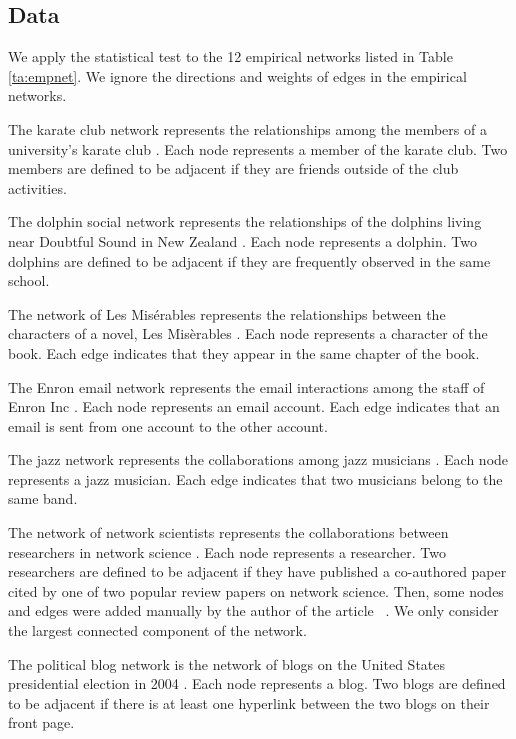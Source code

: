 \documentclass[fleqn,10pt]{wlscirep}
\begin{document}
\subsection{Data}
\label{sec:data}
We apply the statistical test to the 12 empirical networks listed in Table \ref{ta:empnet}.
We ignore the directions and weights of edges in the empirical networks.

The karate club network represents the relationships among the members of a university's karate club \cite{Zachary1977}. 
Each node represents a member of the karate club. 
Two members are defined to be adjacent if they are friends outside of the club activities.

The dolphin social network represents the relationships of the dolphins living near Doubtful Sound in New Zealand \cite{Lusseau2003}. 
Each node represents a dolphin.
Two dolphins are defined to be adjacent if they are frequently observed in the same school. 

The network of Les Mis\'{e}rables represents the relationships between the characters of a novel, Les Mis\`{e}rables \cite{Knuth1993}.
Each node represents a character of the book.
Each edge indicates that they appear in the same chapter of the book.

The Enron email network represents the email interactions among the staff of Enron Inc \cite{Klimt2004}.
Each node represents an email account. 
Each edge indicates that an email is sent from one account to the other account.  

The jazz network represents the collaborations among jazz musicians \cite{Gleiser2003}.
Each node represents a jazz musician. 
Each edge indicates that two musicians belong to the same band.

The network of network scientists represents the collaborations between researchers in network science \cite{Newman2006}.
Each node represents a researcher.
Two researchers are defined to be adjacent if they have published a co-authored paper cited by one of two popular review papers on network science.
Then, some nodes and edges were added manually by the author of the article ~\cite{Newman2006}.
We only consider the largest connected component of the network. 

The political blog network is the network of blogs on the United States presidential election in 2004  \cite{Adamic2005}.
Each node represents a blog. 
Two blogs are defined to be adjacent if there is at least one hyperlink between the two blogs on their front page.
\end{document}
